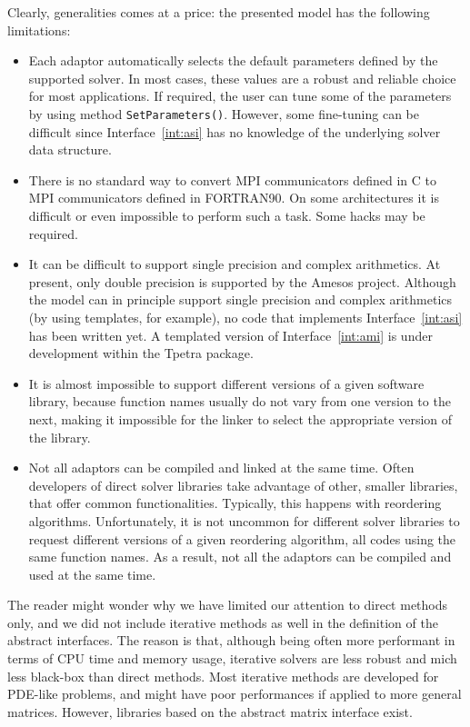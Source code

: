 \documentclass[acmtocl]{acmtrans2m}
\begin{document}
Clearly,  generalities comes at a price: the presented model has the following
limitations:
\begin{itemize}
\item 
Each adaptor automatically selects the default parameters defined by the
supported solver. In most cases, these values are a robust and reliable choice
for most applications. If required, the user can tune some of the parameters
by using method \verb!SetParameters()!. However, some fine-tuning can be
difficult since Interface~\ref{int:asi} has no knowledge of the underlying
solver data structure.

\item There
  is no standard way to 
  convert MPI communicators defined in C to MPI communicators defined
  in FORTRAN90. On some architectures it is difficult or even
  impossible to perform such a task. Some hacks may be required.

\item It can be difficult to support single precision and complex arithmetics.
At present, only double precision is supported by the Amesos project. 
Although the model can in
principle support single precision and complex arithmetics 
(by using templates, for example), no code
that implements Interface~\ref{int:asi} has been written yet. A templated
version of Interface~\ref{int:ami} is under development within the Tpetra
package.

\item 
It is almost impossible to support different versions of a given software
library, because
function names usually do not vary from one version to the
next, making it impossible for the linker to select the
  appropriate version of the library.

\item 
Not all adaptors can be compiled and linked at the same time. Often
developers of direct solver libraries take advantage of other, smaller
libraries, that offer common functionalities. Typically, this happens with
reordering algorithms. Unfortunately,
  it is not uncommon for different solver libraries to request different
  versions of a given reordering algorithm, all codes using the same function
  names. As a result, not all the adaptors can be compiled and used at the
  same time.
\end{itemize}

The reader might wonder why we have limited our attention to direct methods only, and
we did not include iterative methods as well in the definition of the abstract
interfaces. The reason is that, although
being often more performant in terms of CPU time and memory usage, iterative
solvers are less robust and mich less black-box than direct methods. Most
iterative methods are developed for PDE-like problems, and might have poor
performances if applied to more general matrices. However, libraries based on
the abstract matrix interface exist.
\end{document}
